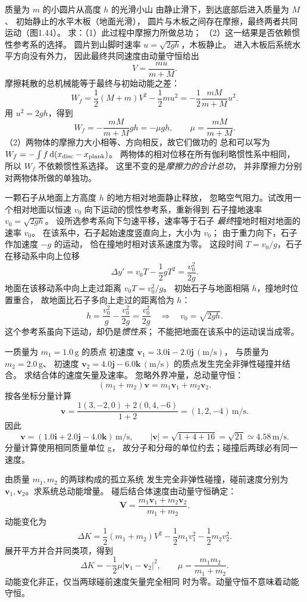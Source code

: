 质量为 $m$ 的小圆片从高度 $h$ 的光滑小山
由静止滑下，到达底部后进入质量为 $M$、
初始静止的水平木板（地面光滑），
圆片与木板之间存在摩擦，最终两者共同运动（图1.44）。
求：（1）此过程中摩擦力所做总功；
（2）这一结果是否依赖惯性参考系的选择。
\exsolution
圆片到山脚时速率
$u=\sqrt{2gh}$，木板静止。
进入木板后系统水平方向没有外力，
因此最终共同速度由动量守恒给出
\[
V=\frac{mu}{m+M}.
\]
摩擦耗散的总机械能等于最终与初始动能之差：
\[
W_f=\frac12(M+m)V^2-\frac12mu^2
=-\frac12\frac{mM}{m+M}u^2.
\]
用 $u^2=2gh$，得到
\[
\boxed{W_f=-\frac{mM}{m+M}gh=-\mu gh},
\qquad \mu=\frac{mM}{m+M}.
\]
（2）两物体的摩擦力大小相等、方向相反，故它们做功的
总和可以写为
$W_f=-\int f\,\mathrm d(x_{\rm disc}-x_{\rm plank})$。
两物体的相对位移在所有伽利略惯性系中相同，
所以 $\boxed{W_f\text{ 不依赖惯性系选择}}$。
\excheck 这里不变的是\emph{摩擦力的合计总功}，
并非摩擦力分别对两物体所做的单独功。

一颗石子从地面上方高度 $h$ 的地方相对地面静止释放，
忽略空气阻力。试改用一个相对地面以恒速
$v_0$ 向下运动的惯性参考系，重新得到
石子撞地速率 $v_0=\sqrt{2gh}$。
\exsolution
设所选参考系向下匀速平移，速率等于石子
\emph{最终}撞地时相对地面的速率 $v_0$。
在该系中，石子起始速度竖直向上，大小为 $v_0$；
由于重力向下，石子作加速度 $-g$ 的运动，
恰在撞地时相对该系速度为零。
这段时间 $T=v_0/g$，石子在移动系中向上位移
\[
\Delta y' =v_0T-\frac12gT^2=\frac{v_0^2}{2g}.
\]
地面在该移动系中向上走过距离
$v_0T=v_0^2/g$。
初始石子与地面相隔 $h$，撞地时位置重合，
故地面比石子多向上走过的距离恰为 $h$：
\[
h=\frac{v_0^2}{g}-\frac{v_0^2}{2g}
=\frac{v_0^2}{2g}
\quad\Longrightarrow\quad
\boxed{v_0=\sqrt{2gh}}.
\]
\excheck 这个参考系虽向下运动，却仍是\emph{惯性系}；
不能把地面在该系中的运动误当成零。

一质量为 $m_1=1.0\,\mathrm g$ 的质点
初速度 $\bm v_1=3.0\bm i-2.0\bm j\,(\mathrm{m/s})$，
与质量为 $m_2=2.0\,\mathrm g$、
初速度 $\bm v_2=4.0\bm j-6.0\bm k\,(\mathrm{m/s})$
的质点发生完全非弹性碰撞并结合。
求结合体的速度矢量及速率。
\exsolution
忽略外界冲量，总动量守恒：
\[
(m_1+m_2)\bm v=m_1\bm v_1+m_2\bm v_2.
\]
按各坐标分量计算
\[
\bm v=
\frac{1(3,-2,0)+2(0,4,-6)}{1+2}
=(1,2,-4)\,\mathrm{m/s}.
\]
因此
\[
\boxed{\bm v=(1.0\bm i+2.0\bm j-4.0\bm k)\,\mathrm{m/s}},
\qquad
\boxed{|\bm v|=\sqrt{1+4+16}=\sqrt{21}
\simeq4.58\,\mathrm{m/s}}.
\]
\excheck 分量计算使用相同质量单位 g，
故分子和分母的单位约去；碰撞后两球必有同一速度。

由质量 $m_1,m_2$ 的两球构成的孤立系统
发生完全非弹性碰撞，碰前速度分别为
$\bm v_1,\bm v_2$。求系统总动能增量。
\exsolution
碰后结合体速度由动量守恒确定：
\[
\bm V=\frac{m_1\bm v_1+m_2\bm v_2}{m_1+m_2}.
\]
动能变化为
\[
\Delta K=\frac12(m_1+m_2)V^2-
\frac12m_1v_1^2-\frac12m_2v_2^2.
\]
展开平方并合并同类项，得到
\[
\boxed{\Delta K=
-\frac12\mu|\bm v_1-\bm v_2|^2},
\qquad
\mu=\frac{m_1m_2}{m_1+m_2}.
\]
\excheck 动能变化非正，仅当两球碰前速度矢量完全相同
时为零。动量守恒不意味着动能守恒。

